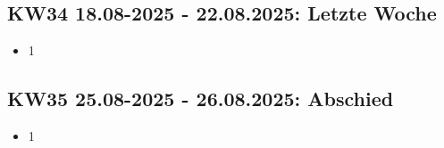 \subsection{KW34 18.08-2025 - 22.08.2025: Letzte Woche}
\begin{itemize}
  \item 1
\end{itemize}


\subsection{KW35 25.08-2025 - 26.08.2025: Abschied}
\begin{itemize}
  \item 1
\end{itemize}